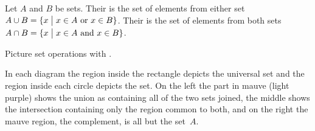 \documentclass{ibl}  %
\begin{document}
\begin{df}
Let $A$ and $B$ be sets.
Their  is the set of elements 
from either set 
$A\cup B=\{x \bigm| \text{$x\in A$ or $x\in B$}\}$.  
Their  is the set of elements 
from both sets
$A\cap B=\{x \bigm| \text{$x\in A$ and $x\in B$}\}$.  
\end{df}

Picture set operations with .
\begin{center}
  \hspace*{3em}
  \hspace*{3em}
\end{center}
In each diagram
the region inside the rectangle depicts the universal set and the 
region inside each circle depicts the set.
On the left the part in mauve (light purple) shows 
the union as containing all of the two sets joined, 
the middle shows the intersection
containing only the region common to both,
and on the right the mauve region, the complement, is all but the set~$A$.
\end{document}
